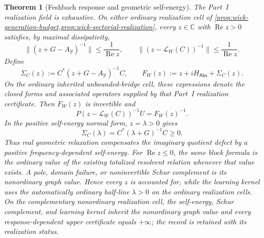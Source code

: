 \documentclass[11pt]{article}
\numberwithin{section}{part}
\theoremstyle{plain}
\newtheorem{theorem}{Theorem}[section]
\theoremstyle{definition}
\theoremstyle{remark}
\newcommand{\Abs}{\mathsf{Abs}}
\begin{document}
\begin{theorem}[Feshbach response and geometric self-energy]
\label{thm:wick-feshbach-response}
The Part~I realization field is exhaustive.  On either ordinary realization
cell of \cref{prop:wick-generation-budget,prop:wick-sectorial-realization},
every \(z\in\mathbb C\) with \(\operatorname{Re}z>0\) satisfies, by maximal
dissipativity,
\begin{equation}
 \label{eq:wick-derived-resolvent-bounds}
 \bigl\|(z+G-A_{\mathcal Y})^{-1}\bigr\|
 \le\frac1{\operatorname{Re}z},
 \qquad
 \bigl\|(z-\mathcal L_W(C))^{-1}\bigr\|
 \le\frac1{\operatorname{Re}z}.
\end{equation}
Define
\begin{equation}
 \label{eq:wick-self-energy}
 \Sigma_C(z)
 :=C^*(z+G-A_{\mathcal Y})^{-1}C,
 \qquad
 F_W(z):=z+iH_{\Abs}+\Sigma_C(z).
\end{equation}
On the ordinary inherited unbounded-bridge cell, these expressions denote the
closed forms and associated operators supplied by that Part~I realization
certificate.
Then \(F_W(z)\) is invertible and
\begin{equation}
 \label{eq:wick-compressed-resolvent}
 P(z-\mathcal L_W(C))^{-1}U=F_W(z)^{-1}.
\end{equation}
In the positive self-energy normal form, \(z=\lambda>0\) gives
\begin{equation}
 \label{eq:wick-positive-self-energy}
 \Sigma_C(\lambda)=C^*(\lambda+G)^{-1}C\ge0.
\end{equation}
Thus real geometric relaxation compensates the imaginary quotient defect by
a positive frequency-dependent self-energy.  For
\(\operatorname{Re}z\le0\), the same block formula is the ordinary value of
the existing totalized resolvent relation whenever that value exists.  A
pole, domain failure, or noninvertible Schur complement is its nonordinary
graph value.  Hence every \(z\) is accounted for, while the learning kernel
uses the automatically ordinary half-line \(\lambda>0\) on the ordinary
realization cells.  On the complementary nonordinary realization cell, the
self-energy, Schur complement, and learning kernel inherit the nonordinary
graph value and every response-dependent upper certificate equals
\(+\infty\); the record is retained with its realization status.
\end{theorem}
\end{document}

